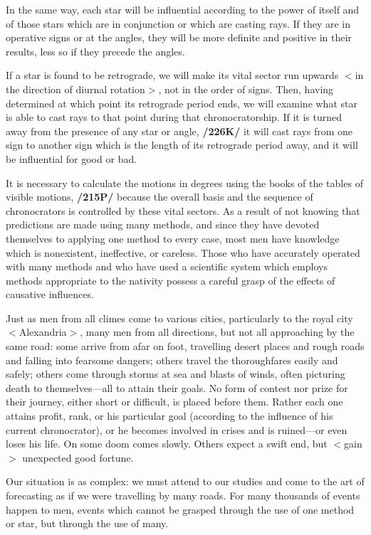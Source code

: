 In the same way, each star will be influential according to the power of itself and of those stars which are in conjunction or which are casting rays. If they are in operative signs or at the angles, they will be more definite and positive in their results, less so if they precede the angles. 

If a star is found to be retrograde, we will make its vital sector run upwards $<$in the direction of diurnal rotation$>$, not in the order
of signs. Then, having determined at which point its retrograde period ends, we will examine what star is able to cast rays to that point during that chronocratorship. If it is turned away from the presence of any star or angle, \textbf{/226K/} it will cast rays from one sign to another sign which is the length of its retrograde period away, and it will be influential for good or bad.

It is necessary to calculate the motions in degrees using the books of the tables of visible motions, \textbf{/215P/} because the overall basis and the sequence of chronocrators is controlled by these vital sectors. As a result of not knowing that predictions are made using many methods, and since they have devoted themselves to applying one method to every case, most men have knowledge which is nonexistent, ineffective, or careless. Those who have accurately operated with many methods and who have used a scientific system which employs methods appropriate to the nativity possess a careful grasp of the effects of causative influences. 

Just as men from all climes come to various cities, particularly to the royal city $<$Alexandria$>$, many men from all directions, but not all approaching by the same road: some arrive from afar on foot, travelling desert places and rough roads and falling into fearsome dangers; others travel the thoroughfares easily and safely; others come through storms at sea and blasts of winds, often picturing death
to themselves—all to attain their goals. No form of contest nor prize for their journey, either short or difficult, is placed before them. Rather each one attains profit, rank, or his particular goal (according to the
influence of his current chronocrator), or he becomes involved in crises and is ruined—or even loses his life. On some doom comes slowly. Others expect a swift end, but $<$gain$>$ unexpected good fortune. 

Our situation is as complex: we must attend to our studies and come to the art of forecasting as if we were travelling by many roads. For many thousands of events happen to men, events which cannot be
grasped through the use of one method or star, but through the use of many. 

